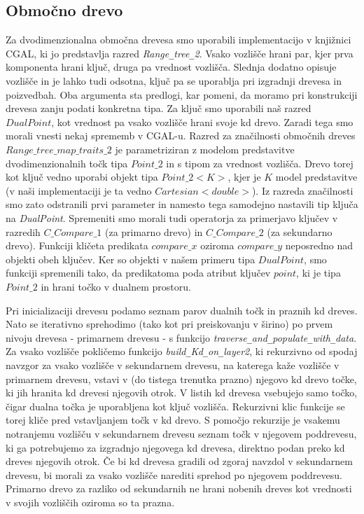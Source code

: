 \documentclass[a4paper, 12pt]{book}
\newcommand{\U}{\texttt{\_}}
\begin{document}
\subsection{Območno drevo}
Za dvodimenzionalna območna drevesa smo uporabili implementacijo v knjiž\-ni\-ci CGAL, ki jo predstavlja razred \textit{Range\texttt{\_}tree\texttt{\_}2}. Vsako vozlišče hrani par, kjer prva komponenta hrani ključ, druga pa vrednost vozlišča. Slednja dodatno opisuje vozlišče in je lahko tudi odsotna, ključ pa se uporablja pri izgradnji drevesa in poizvedbah. Oba argumenta sta predlogi, kar pomeni, da moramo pri konstrukciji drevesa zanju podati konkretna tipa. 
Za ključ smo uporabili naš razred $DualPoint$, kot vrednost pa vsako vozlišče hrani svoje kd drevo. Zaradi tega smo morali vnesti nekaj sprememb v CGAL-u. Razred za značilnosti območnih dreves $Range\U tree\U map\U traits\U 2$ je parametriziran z modelom predstavitve dvodimenzionalnih točk tipa $Point\U 2$ in s tipom za vrednost vozlišča. Drevo torej kot ključ vedno uporabi objekt tipa $Point\U 2<K>$, kjer je $K$ model predstavitve (v naši implementaciji je ta vedno $Cartesian<double>$). Iz razreda značilnosti smo zato odstranili prvi parameter in namesto tega samodejno nastavili tip ključa na \textit{DualPoint}. Spremeniti smo morali tudi operatorja za primerjavo ključev v razredih $C\U Compare\U 1$ (za primarno drevo) in $C\U Compare\U 2$ (za sekundarno drevo). Funkciji kličeta predikata $compare\U x$ oziroma $compare\U y$ neposredno nad objekti obeh ključev. Ker so objekti v našem primeru tipa $DualPoint$, smo funkciji spremenili tako, da predikatoma poda atribut ključev $point$, ki je tipa $Point\U 2$ in hrani točko v dualnem prostoru.

Pri inicializaciji drevesu podamo seznam parov dualnih točk in praznih kd dreves. Nato se iterativno sprehodimo (tako kot pri preiskovanju v širino) po prvem nivoju drevesa - primarnem drevesu - s funkcijo \textit{traverse\U and\U popu\-la\-te\U with\U data}. Za vsako vozlišče pokličemo funkcijo \textit{build\U Kd\U on\U la\-yer2}, ki rekurzivno  od spodaj navzgor za vsako vozlišče v sekundarnem drevesu, na katerega kaže vozlišče v primarnem drevesu, vstavi v (do tistega trenutka prazno) njegovo kd drevo točke, ki jih hranita kd drevesi njegovih otrok. V listih kd drevesa vsebujejo samo točko, čigar dualna točka je uporabljena kot ključ vozlišča. Rekurzivni klic funkcije se torej kliče pred vstavljanjem točk v kd drevo. S pomočjo rekurzije je vsakemu notranjemu vozlišču v sekundarnem drevesu seznam točk v njegovem poddrevesu, ki ga potrebujemo za izgradnjo njegovega kd drevesa, direktno podan preko kd dreves njegovih otrok. Če bi kd drevesa gradili od zgoraj navzdol v sekundarnem drevesu, bi morali za vsako vozlišče narediti sprehod po njegovem poddrevesu. Primarno drevo za razliko od sekundarnih ne hrani nobenih dreves kot vrednosti v svojih vozliščih oziroma so ta prazna.
\end{document}
